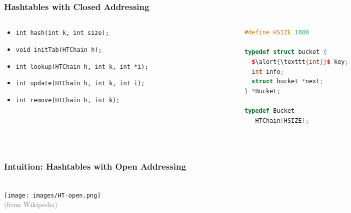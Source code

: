 \documentclass[aspectratio=169]{beamer}
\begin{document}
\begin{frame}[fragile]\frametitle{Hashtables with Closed Addressing}
\begin{columns}
\begin{column}{.61\textwidth}
%
\begin{itemize}
  \item \texttt{int hash(\alert{\texttt{int}} k, int size);}
  \item \texttt{void initTab(HTChain h);}
  \item \texttt{int lookup(HTChain h, \alert{\texttt{int}} k, int *i);}
  \item \texttt{int update(HTChain h, \alert{\texttt{int}} k, int i);}
  \item \texttt{int remove(HTChain h, \alert{\texttt{int}} k);}
\end{itemize}
%
\end{column}
\begin{column}{.34\textwidth}
%
\begin{lstlisting}[language=C++,emph={HTChain,Bucket}]
#define HSIZE 1000

typedef struct bucket {
  $\alert{\texttt{int}}$ key;
  int info;
  struct bucket *next;
} *Bucket;

typedef Bucket
   HTChain[HSIZE];
\end{lstlisting}
%
\end{column}
\end{columns}

~\\[-10mm]
\end{frame}


\begin{frame}\frametitle{Intuition: Hashtables with Open Addressing}
  \centering
  ~\\[-12mm]
  \texttt{[image: images/HT-open.png]}
  \\
  {\footnotesize \textcolor{gray}{(from Wikipedia)}}
\end{frame}
\end{document}
